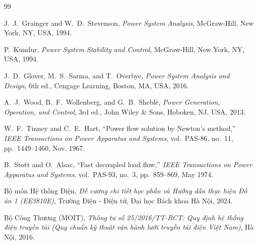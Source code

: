 \documentclass[12pt,a4paper,oneside]{report}
\begin{document}
\begin{thebibliography}{99}

J.~J.~Grainger and W.~D.~Stevenson, \textit{Power System Analysis}, McGraw-Hill, New York, NY, USA, 1994.

P.~Kundur, \textit{Power System Stability and Control}, McGraw-Hill, New York, NY, USA, 1994.

J.~D.~Glover, M.~S.~Sarma, and T.~Overbye, \textit{Power System Analysis and Design}, 6th ed., Cengage Learning, Boston, MA, USA, 2016.

A.~J.~Wood, B.~F.~Wollenberg, and G.~B.~Sheblé, \textit{Power Generation, Operation, and Control}, 3rd ed., John Wiley \& Sons, Hoboken, NJ, USA, 2013.

W.~F.~Tinney and C.~E.~Hart, ``Power flow solution by Newton's method,'' \textit{IEEE Transactions on Power Apparatus and Systems}, vol.~PAS-86, no.~11, pp.~1449--1460, Nov. 1967.

B.~Stott and O.~Alsac, ``Fast decoupled load flow,'' \textit{IEEE Transactions on Power Apparatus and Systems}, vol.~PAS-93, no.~3, pp.~859--869, May 1974.

Bộ môn Hệ thống Điện, \textit{Đề cương chi tiết học phần và Hướng dẫn thực hiện Đồ án 1 (EE3810E)}, Trường Điện - Điện tử, Đại học Bách khoa Hà Nội, 2024.

Bộ Công Thương (MOIT), \textit{Thông tư số 25/2016/TT-BCT: Quy định hệ thống điện truyền tải (Quy chuẩn kỹ thuật vận hành lưới truyền tải điện Việt Nam)}, Hà Nội, 2016.

\end{thebibliography}
\end{document}
